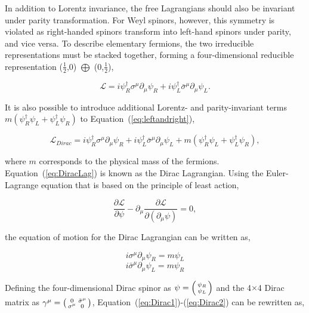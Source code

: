In addition to Lorentz invariance, the free Lagrangians should also be invariant under parity transformation. For Weyl spinors, however, this symmetry is violated as right-handed spinors transform into left-hand spinors under parity, and vice versa. To describe elementary fermions, the two irreducible representations must be stacked together, forming a four-dimensional reducible representation ($\frac{1}{2}$,0) $\bigoplus$ (0,$\frac{1}{2}$),

\begin{equation}
\label{eq:leftandright}
\mathcal{L}=i\psi_{R}^{\dagger}\sigma^{\mu}\partial_{\mu}\psi_{R}+i\psi_{L}^{\dagger}\bar{\sigma}^{\mu}\partial_{\mu}\psi_{L}.
\end{equation}

It is also possible to introduce additional Lorentz- and parity-invariant terms $m(\psi_{R}^{\dagger}\psi_{L}+\psi_{L}^{\dagger}\psi_{R})$ to Equation~(\ref{eq:leftandright}),

\begin{equation}
\label{eq:DiracLag}
\mathcal{L}_{Dirac}=i\psi_{R}^{\dagger}\sigma^{\mu}\partial_{\mu}\psi_{R}+i\psi_{L}^{\dagger}\bar{\sigma}^{\mu}\partial_{\mu}\psi_{L}+m(\psi_{R}^{\dagger}\psi_{L}+\psi_{L}^{\dagger}\psi_{R}),
\end{equation}

where $m$ corresponds to the physical mass of the fermions. Equation~(\ref{eq:DiracLag}) is known as the Dirac Lagrangian. Using the Euler-Lagrange equation that is based on the principle of least action,

\begin{equation}
\frac{\partial\mathcal{L}}{\partial\psi}-\partial_{\mu}\frac{\partial\mathcal{L}}{\partial(\partial_{\mu}\psi)}=0,
\end{equation}

the equation of motion for the Dirac Lagrangian can be written as,

\begin{equation}
\label{eq:Dirac1}
i\sigma^{\mu}\partial_{\mu}\psi_{R}=m\psi_{L}
\end{equation}
\begin{equation}
\label{eq:Dirac2}
i\bar{\sigma}^{\mu}\partial_{\mu}\psi_{L}=m\psi_{R}
\end{equation}

Defining the four-dimensional Dirac spinor as $\psi=\begin{psmallmatrix}\psi_{R}\\\psi_{L}\end{psmallmatrix}$ and the 4$\times$4 Dirac matrix as $\gamma^{\mu}=\begin{psmallmatrix}0&\bar{\sigma}^{\mu}\\\sigma^{\mu}&0\end{psmallmatrix}$, Equation~(\ref{eq:Dirac1})-(\ref{eq:Dirac2}) can be rewritten as,

